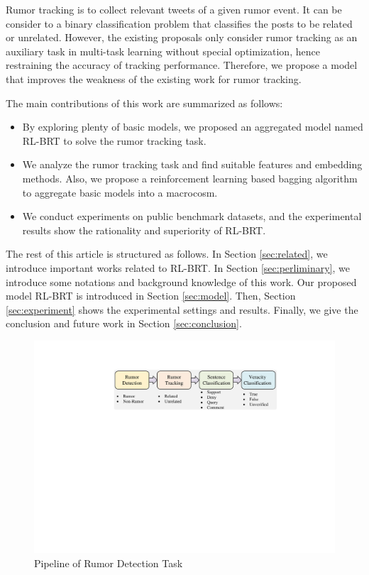 Rumor tracking is to collect relevant tweets of a given rumor event. It can be consider to a binary classification problem that classifies the posts to be related or unrelated. However, the existing proposals \cite{DBLP:conf/emnlp/QazvinianRRM11, DBLP:conf/www/ChengNB20}  only consider rumor tracking as an auxiliary task in multi-task learning without special optimization, hence restraining the accuracy of tracking performance.
Therefore, we propose a model that improves the weakness of the existing work for rumor tracking.

The main contributions of this work are summarized as follows:
\begin{itemize}
	\item By exploring plenty of basic models, we proposed an aggregated model named RL-BRT to solve the rumor tracking task. 
	\item We analyze the rumor tracking task and find suitable features and embedding methods. Also, we propose a reinforcement learning based bagging algorithm to aggregate basic models into a macrocosm.
	\item We conduct experiments on public benchmark datasets, and the experimental results show the rationality and superiority of RL-BRT.
\end{itemize}

The rest of this article is structured as follows. In Section \ref{sec:related}, we introduce important works related to RL-BRT. In Section \ref{sec:perliminary}, we introduce some notations and background knowledge of this work. Our proposed model RL-BRT is introduced in Section \ref{sec:model}. Then, Section \ref{sec:experiment} shows the experimental settings and results. Finally, we give the conclusion and future work in Section \ref{sec:conclusion}.

\begin{figure}[tbp]
	\hspace{0ex}
	\vspace{0ex}
	\centering
	\includegraphics[width = \textwidth]{fig/pipeline}
	\caption{Pipeline of Rumor Detection Task}
	\label{fig:pipeline}
\end{figure}